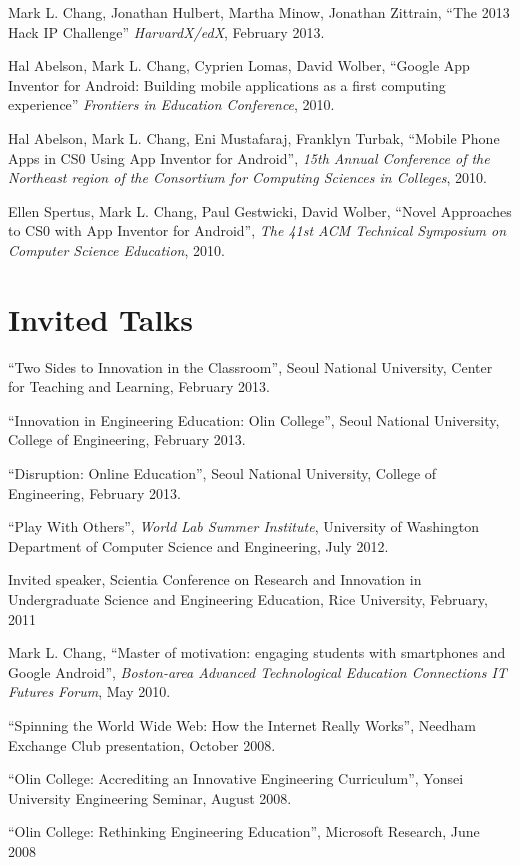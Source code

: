 \documentclass[line]{res}
\begin{document}
\begin{resume}
	Mark L. Chang, Jonathan Hulbert, Martha Minow, Jonathan Zittrain, ``The 2013 Hack IP Challenge'' \textit{HarvardX/edX}, February 2013.

	Hal Abelson, Mark L. Chang, Cyprien Lomas, David Wolber, ``Google App Inventor for Android: Building mobile applications as a first computing experience'' \textit{Frontiers in Education Conference}, 2010.
	
	Hal Abelson, Mark L. Chang, Eni Mustafaraj, Franklyn Turbak, ``Mobile Phone Apps in CS0 Using App Inventor for Android'', \textit{15th Annual Conference of the Northeast region of the Consortium for Computing Sciences in Colleges}, 2010.
	
	Ellen Spertus, Mark L. Chang, Paul Gestwicki, David Wolber, ``Novel Approaches to CS0 with App Inventor for Android'', \textit{The 41st ACM Technical Symposium on Computer Science Education}, 2010.
	
	\section{\sc Invited Talks}

	``Two Sides to Innovation in the Classroom'', Seoul National University, Center for Teaching and Learning, February 2013.

	``Innovation in Engineering Education: Olin College'', Seoul National University, College of Engineering, February 2013.

	``Disruption: Online Education'', Seoul National University, College of Engineering, February 2013.
	
	``Play With Others'', \textit{World Lab Summer Institute}, University of Washington Department of Computer Science and Engineering, July 2012.

	Invited speaker, Scientia Conference on Research and Innovation in Undergraduate Science and Engineering Education, Rice University, February, 2011
	
	Mark L. Chang, ``Master of motivation: engaging students with smartphones and Google Android'', \textit{Boston-area Advanced Technological Education Connections IT Futures Forum}, May 2010.
	
	``Spinning the World Wide Web: How the Internet Really Works'', Needham Exchange Club presentation, October 2008.
	
	``Olin College: Accrediting an Innovative Engineering Curriculum'', Yonsei University Engineering Seminar, August 2008.
	
	``Olin College: Rethinking Engineering Education'', Microsoft Research, June 2008
	

\end{resume}
\end{document}
